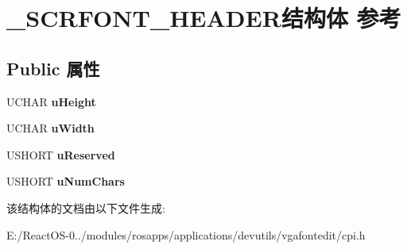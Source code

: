 \hypertarget{struct___s_c_r_f_o_n_t___h_e_a_d_e_r}{}\section{\+\_\+\+S\+C\+R\+F\+O\+N\+T\+\_\+\+H\+E\+A\+D\+E\+R结构体 参考}
\label{struct___s_c_r_f_o_n_t___h_e_a_d_e_r}
\subsection*{Public 属性}
\begin{DoxyCompactItemize}
\item 
\mbox{\label{struct___s_c_r_f_o_n_t___h_e_a_d_e_r_aeae183a1cebebb21e1a99b53c390b5f7}} 
U\+C\+H\+AR {\bfseries u\+Height}
\item 
\mbox{\label{struct___s_c_r_f_o_n_t___h_e_a_d_e_r_ad573b4ac91785f799da6c70419543efb}} 
U\+C\+H\+AR {\bfseries u\+Width}
\item 
\mbox{\label{struct___s_c_r_f_o_n_t___h_e_a_d_e_r_a0232bfb18ee5e6db3a49264ecf4560da}} 
U\+S\+H\+O\+RT {\bfseries u\+Reserved}
\item 
\mbox{\label{struct___s_c_r_f_o_n_t___h_e_a_d_e_r_a86dbf8d2ac899099e4361b7bb092fab1}} 
U\+S\+H\+O\+RT {\bfseries u\+Num\+Chars}
\end{DoxyCompactItemize}


该结构体的文档由以下文件生成\+:\begin{DoxyCompactItemize}
\item 
E\+:/\+React\+O\+S-\/0../modules/rosapps/applications/devutils/vgafontedit/cpi.\+h\end{DoxyCompactItemize}
